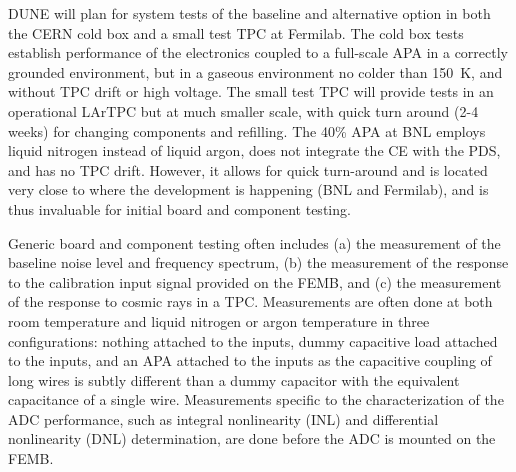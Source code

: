 DUNE will plan for system tests of the baseline and alternative option in both the CERN cold box and a small test TPC at Fermilab.  The cold box tests establish performance of the electronics coupled to a full-scale APA in a correctly grounded environment, but in a gaseous environment no colder than 150~K, and without TPC drift or high voltage.  The small test TPC will provide tests in an operational LArTPC but at much smaller scale, with quick turn around (2-4 weeks) for changing components and refilling.  The 40\% APA at BNL employs liquid nitrogen instead of liquid argon, does not integrate the CE with the PDS, and has no TPC drift.  However, it allows for quick turn-around and is located very close to where the development is happening (BNL and Fermilab), and is thus invaluable for initial board and component testing.

Generic board and component testing often includes (a) the measurement of the baseline noise level and frequency spectrum, (b) the measurement of the response to the calibration input signal provided on the FEMB, and (c) the measurement of the response to cosmic rays in a TPC.  Measurements are often done at both room temperature and liquid nitrogen or argon temperature in three configurations: nothing attached to the inputs, dummy capacitive load attached to the inputs, and an APA attached to the inputs as the capacitive coupling of long wires is subtly different than a dummy capacitor with the equivalent capacitance of a single wire.  Measurements specific to the characterization of the ADC performance, such as integral nonlinearity (INL) and differential nonlinearity (DNL) determination, are done before the ADC is mounted on the FEMB.
